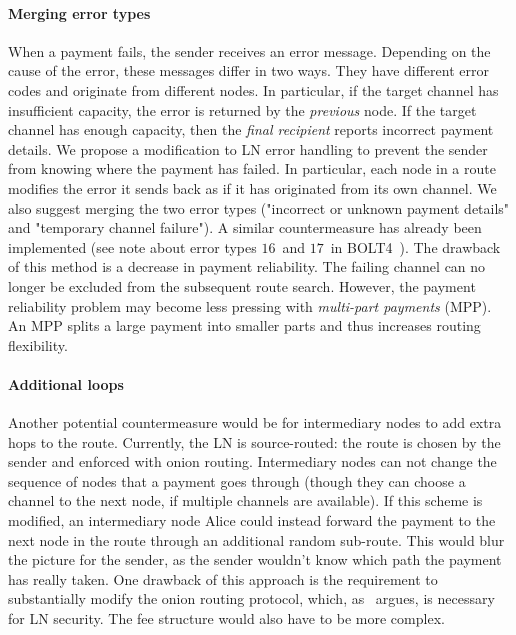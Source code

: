 \paragraph{Merging error types}
When a payment fails, the sender receives an error message.
Depending on the cause of the error, these messages differ in two ways.
They have different error codes and originate from different nodes.
In particular, if the target channel has insufficient capacity, the error is returned by the \textit{previous} node.
If the target channel has enough capacity, then the \textit{final recipient} reports incorrect payment details.
We propose a modification to LN error handling to prevent the sender from knowing where the payment has failed.
In particular, each node in a route modifies the error it sends back as if it has originated from its own channel.
We also suggest merging the two error types ("incorrect or unknown payment details" and "temporary channel failure").
A similar countermeasure has already been implemented (see note about error types $16$~and $17$~in BOLT4~\cite{Bolt4OnionRouting}).
The drawback of this method is a decrease in payment reliability.
The failing channel can no longer be excluded from the subsequent route search.
However, the payment reliability problem may become less pressing with \textit{multi-part payments} (MPP).
An MPP splits a large payment into smaller parts and thus increases routing flexibility.

\paragraph{Additional loops}
Another potential countermeasure would be for intermediary nodes to add extra hops to the route.
Currently, the LN is source-routed: the route is chosen by the sender and enforced with onion routing.
Intermediary nodes can not change the sequence of nodes that a payment goes through (though they can choose a channel to the next node, if multiple channels are available).
If this scheme is modified, an intermediary node Alice could instead forward the payment to the next node in the route through an additional random sub-route.
This would blur the picture for the sender, as the sender wouldn't know which path the payment has really taken.
One drawback of this approach is the requirement to substantially modify the onion routing protocol, which, as~\cite{Malavolta2019} argues, is necessary for LN security.
The fee structure would also have to be more complex.

